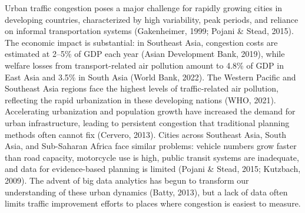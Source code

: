 \documentclass[12pt,a4paper]{article}
\begin{document}
Urban traffic congestion poses a major challenge for rapidly growing cities in developing countries, characterized by high variability, peak periods, and reliance on informal transportation systems (Gakenheimer, 1999; Pojani \& Stead, 2015). The economic impact is substantial: in Southeast Asia, congestion costs are estimated at 2–5\% of GDP each year (Asian Development Bank, 2019), while welfare losses from transport-related air pollution amount to 4.8\% of GDP in East Asia and 3.5\% in South Asia (World Bank, 2022). The Western Pacific and Southeast Asia regions face the highest levels of traffic-related air pollution, reflecting the rapid urbanization in these developing nations (WHO, 2021). Accelerating urbanization and population growth have increased the demand for urban infrastructure, leading to persistent congestion that traditional planning methods often cannot fix (Cervero, 2013). Cities across Southeast Asia, South Asia, and Sub-Saharan Africa face similar problems: vehicle numbers grow faster than road capacity, motorcycle use is high, public transit systems are inadequate, and data for evidence-based planning is limited (Pojani \& Stead, 2015; Kutzbach, 2009). The advent of big data analytics has begun to transform our understanding of these urban dynamics (Batty, 2013), but a lack of data often limits traffic improvement efforts to places where congestion is easiest to measure.
\end{document}
